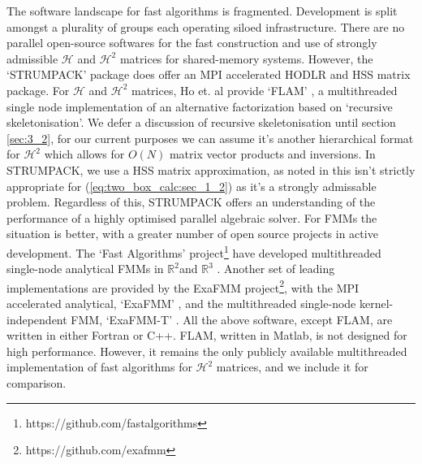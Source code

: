 The software landscape for fast algorithms is fragmented. Development  is split amongst a plurality of groups each operating siloed infrastructure. There are no parallel open-source softwares for the fast construction and use of strongly admissible $\mathcal{H}$ and $\mathcal{H}^2$ matrices for shared-memory systems. However, the `STRUMPACK' \cite{ghyselsstrumpack} package does offer an MPI accelerated HODLR and HSS matrix package. For $\mathcal{H}$ and $\mathcal{H}^2$ matrices, Ho et. al provide `FLAM' \cite{ho2020flam}, a multithreaded single node implementation of an alternative factorization based on `recursive skeletonisation'. We defer a discussion of recursive skeletonisation until section \ref{sec:3_2}, for our current purposes we can assume it's another hierarchical format for $\mathcal{H}^2$ which allows for $O(N)$ matrix vector products and inversions. In STRUMPACK, we use a HSS matrix approximation, as noted in \cite{yokota2015fast} this isn't strictly appropriate for (\ref{eq:two_box_calc:sec_1_2}) as it's a strongly admissable problem. Regardless of this, STRUMPACK offers an understanding of the performance of a highly optimised parallel algebraic solver. For FMMs the situation is better, with a greater number of open source projects in active development. The `Fast Algorithms' project\footnote{https://github.com/fastalgorithms} have developed multithreaded single-node analytical FMMs in $\mathbb{R}^2$and $\mathbb{R}^3$ \cite{fmm2d, fmm3d}. Another set of leading implementations are provided by the ExaFMM project\footnote{https://github.com/exafmm}, with the MPI accelerated analytical, `ExaFMM' \cite{exafmm}, and the multithreaded single-node kernel-independent FMM, `ExaFMM-T' \cite{wang2021exafmm}. All the above software, except FLAM, are written in either Fortran or C++. FLAM, written in Matlab, is not designed for high performance. However, it remains the only publicly available multithreaded implementation of fast algorithms for $\mathcal{H}^2$ matrices, and we include it for comparison.

